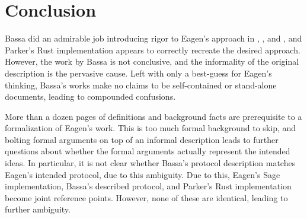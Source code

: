 \documentclass{article}
\theoremstyle{definition}
\newcommand{\6}{\mathbf}
\newcommand{\7}{\mathcal}
\begin{document}
\section{Conclusion}

Bassa did an admirable job introducing rigor to Eagen's approach in \cite{BassaSoundnessProofSoP}, \cite{BassaLogDerivSoP}, and \cite{BassaSoundnessIPDL}, and Parker's Rust implementation appears to correctly recreate the desired approach. However, the work by Bassa is not conclusive, and the informality of the original description is the pervasive cause. Left with only a best-guess for Eagen's thinking, Bassa's works make no claims to be self-contained or stand-alone documents, leading to compounded confusions. 

More than a dozen pages of definitions and background facts are prerequisite to a formalization of Eagen's work. This is too much formal background to skip, and bolting formal arguments on top of an informal description leads to further questions about whether the formal arguments actually represent the intended ideas. In particular, it is not clear whether Bassa's protocol description matches Eagen's intended protocol, due to this ambiguity. Due to this, Eagen's Sage implementation, Bassa's described protocol, and Parker's Rust implementation become joint reference points. However, none of these are identical, leading to further ambiguity.





\end{document}
